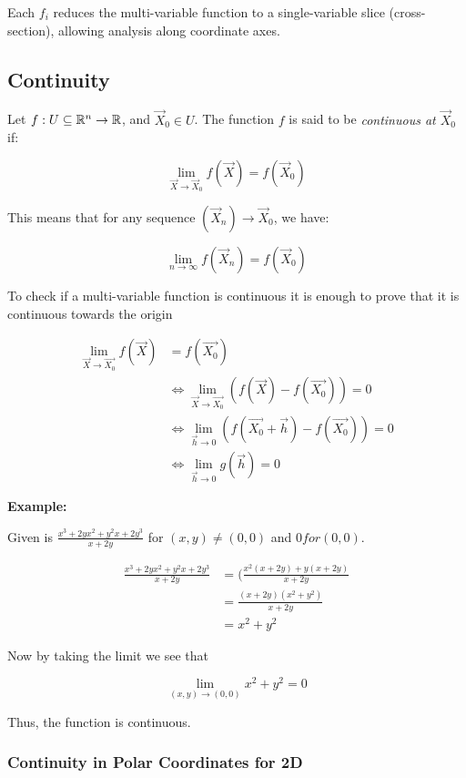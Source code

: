 Each \( f_i \) reduces the multi-variable function to a single-variable slice (cross-section), 
allowing analysis along coordinate axes.


\subsection{Continuity}

Let \( f : U \subseteq \mathbb{R}^n \to \mathbb{R} \), and \( \vec{X}_0 \in U \). The function 
\(f\) is said to be \emph{continuous at \( \vec{X}_0 \)} if:

\[
    \lim_{\vec{X} \to \vec{X}_0} f(\vec{X}) = f(\vec{X}_0)
\]

This means that for any sequence \( (\vec{X}_n) \to \vec{X}_0 \), we have:

\[
    \lim_{n \to \infty} f(\vec{X}_n) = f(\vec{X}_0)
\]

To check if a multi-variable function is continuous it is enough to prove that it is continuous towards 
the origin

\begin{align*}
    \lim_{\vec{X} \to \vec{X_0}}f(\vec{X}) &= f(\vec{X_0}) \\
    &\iff \lim_{\vec{X} \to \vec{X_0}} \left(f(\vec{X}) - f(\vec{X_0})\right) = 0 \\
    &\iff \lim_{\vec{h} \to 0} \left(f(\vec{X_0} + \vec{h}) - f(\vec{X_0})\right) = 0 \\
    &\iff \lim_{\vec{h} \to 0} g(\vec{h}) = 0
\end{align*}

\textbf{Example:}
\vspace{\baselineskip}

Given is \(\frac{x^3 + 2yx^2 + y^2x + 2y^3}{x + 2y}\) for \((x,y) \ne (0,0)\) and \(0 for (0,0)\).

\begin{align*}
    \frac{x^3 + 2yx^2 + y^2x + 2y^3}{x + 2y} &= (\frac{x^2(x + 2y) + y(x + 2y)}{x + 2y}\\
    &= \frac{(x + 2y)(x^2 + y^2)}{x + 2y}\\
    &= x^2 + y^2
\end{align*}

Now by taking the limit we see that

\[
    \lim_{(x,y) \to (0,0)} x^2 + y^2 = 0
\]

Thus, the function is continuous.


\subsubsection{Continuity in Polar Coordinates for 2D}

